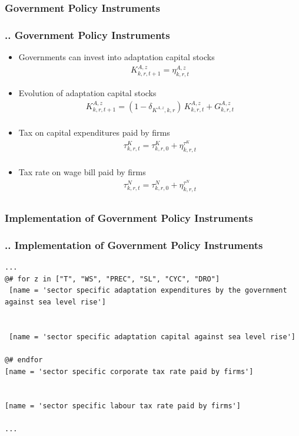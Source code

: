 \documentclass[11pt,aspectratio=169]{beamer}
\begin{document}
\subsubsection{Government Policy Instruments}
\begin{frame}
\frametitle{{\thesection.\thesubsection.\thesubsubsection} Government Policy Instruments}
\scriptsize
\begin{itemize}
\item Governments can invest into adaptation capital stocks
\begin{align*}
K^{A,z}_{k,r,t+1} = \eta^{A,z}_{k,r,t}
\end{align*}
\item Evolution of adaptation capital stocks
\begin{align*}
K^{A,z}_{k,r,t+1} = (1 - \delta_{K^{A,z},k,r}) \, K^{A,z}_{k,r,t} + G^{A,z}_{k,r,t} \nonumber \\
\end{align*}
\item Tax on capital expenditures paid by firms
\begin{align*}
\tau^{K}_{k,r,t} = \tau^{K}_{k,r,0} + \eta^{\tau^{K}}_{k,r,t} \nonumber \\
\end{align*}
\item Tax rate on wage bill paid by firms
\begin{align*}
\tau^{N}_{k,r,t} = \tau^{N}_{k,r,0} + \eta^{\tau^{N}}_{k,r,t} \nonumber \\
\end{align*}
\end{itemize}
\end{frame}

\subsubsection{Implementation of Government Policy Instruments}
\begin{frame}[fragile]
\frametitle{{\thesection.\thesubsection.\thesubsubsection} Implementation of Government Policy Instruments}

\begin{lstlisting}[frame = single]
...
@# for z in ["T", "WS", "PREC", "SL", "CYC", "DRO"]
 [name = 'sector specific adaptation expenditures by the government against sea level rise']


 [name = 'sector specific adaptation capital against sea level rise']

@# endfor
[name = 'sector specific corporate tax rate paid by firms']


[name = 'sector specific labour tax rate paid by firms']

...
\end{lstlisting}
\end{frame}
\end{document}
